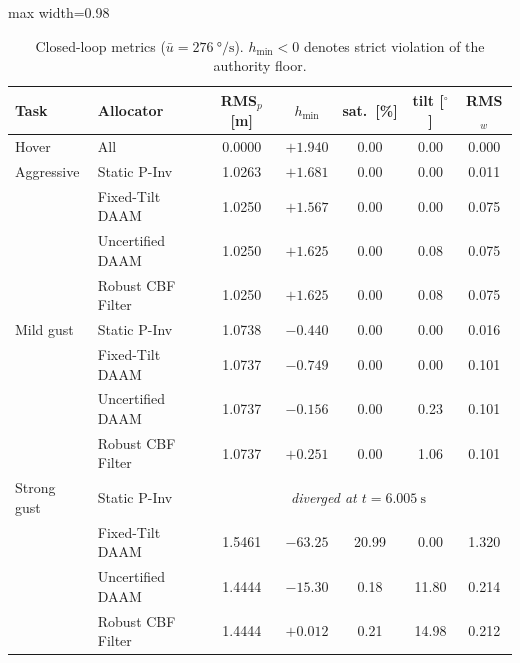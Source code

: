 \documentclass[letter, 10 pt, journal, twoside]{IEEEtran}
\theoremstyle{compact}
\begin{document}
\begin{table}[t]
    \caption{\small Closed-loop metrics ($\bar u=\SI{276}{\degree\per\second}$). $h_{\min}<0$ denotes strict violation of the authority floor.} %
    \label{tab:e4}
    \vspace{-0.5em}
    \renewcommand{\arraystretch}{0.7}
    \centering\footnotesize\setlength{\tabcolsep}{3pt}
    \begin{adjustbox}{max width=0.98\columnwidth}
    \begin{tabular}{@{}llccccc@{}}
    \toprule
    Task & Allocator & RMS$_p$ [m] & $h_{\min}$ & sat.\ [\%] & tilt [$^\circ$] & RMS$_w$ \\
    \midrule
    Hover       & All & 0.0000 & $+1.940$ & 0.00 & 0.00 & 0.000 \\
    \midrule
    Aggressive  & Static P-Inv & 1.0263 & $+1.681$ & 0.00 & 0.00 & 0.011 \\
                & Fixed-Tilt DAAM & 1.0250 & $+1.567$ & 0.00 & 0.00 & 0.075 \\
                & Uncertified DAAM & 1.0250 & $+1.625$ & 0.00 & 0.08 & 0.075 \\
                & Robust CBF Filter & 1.0250 & $+1.625$ & 0.00 & 0.08 & 0.075 \\
    \midrule
    Mild gust   & Static P-Inv & 1.0738 & $\mathbf{-0.440}$ & 0.00 & 0.00 & 0.016 \\
                & Fixed-Tilt DAAM & 1.0737 & $\mathbf{-0.749}$ & 0.00 & 0.00 & 0.101 \\
                & Uncertified DAAM & 1.0737 & $\mathbf{-0.156}$ & 0.00 & 0.23 & 0.101 \\
                & Robust CBF Filter & 1.0737 & $\mathbf{+0.251}$ & 0.00 & 1.06 & 0.101 \\
    \midrule
    Strong gust & Static P-Inv & \multicolumn{5}{c}{\emph{diverged at $t=\SI{6.005}{\second}$}} \\
                & Fixed-Tilt DAAM & 1.5461 & $\mathbf{-63.25}$ & 20.99 & 0.00  & 1.320 \\
                & Uncertified DAAM & 1.4444 & $\mathbf{-15.30}$ & 0.18  & 11.80 & 0.214 \\
                & Robust CBF Filter & 1.4444 & $\mathbf{+0.012}$ & 0.21  & 14.98 & 0.212 \\
    \bottomrule
    \end{tabular}
    \end{adjustbox}
\end{table}
\end{document}
